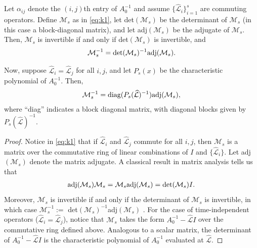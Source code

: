 \documentclass[review]{siamart}
\begin{document}
%
\begin{lemma}\label{lem:inv}
Let $\alpha_{ij}$ denote the $(i,j)$th entry of $A_0^{-1}$ and assume
$\{\widehat{\mathcal{L}}_i\}_{i=1}^s$ are commuting operators. Define $\mathcal{M}_s$
as in \eqref{eq:k1},
let det$(\mathcal{M}_s)$ be the determinant of $\mathcal{M}_s$ (in this case a block-diagonal
matrix), and let adj$(\mathcal{M}_s)$ be the adjugate of $\mathcal{M}_s$. Then, $\mathcal{M}_s$
is invertible if and only if det$(\mathcal{M}_s)$ is invertible, and
\begin{align*}
\mathcal{M}_s^{-1} = \textnormal{det}(\mathcal{M}_s)^{-1}\textnormal{adj}(\mathcal{M}_s).
\end{align*}
%

Now, suppose $\widehat{\mathcal{L}}_i = \widehat{\mathcal{L}}_j$ for
all $i,j$, and let $P_s(x)$ be the characteristic polynomial of $A_0^{-1}$. Then,
\begin{align*}
\mathcal{M}_s^{-1} = \textnormal{diag}(P_s(\widehat{\mathcal{L}})^{-1})\textnormal{adj}(\mathcal{M}_s),
\end{align*}
where ``diag'' indicates a block diagonal matrix, with diagonal blocks given by $P_s(\widehat{\mathcal{L}})^{-1}$.
\end{lemma}
%
\begin{proof}
Notice in \eqref{eq:k1} that if $\widehat{\mathcal{L}}_i$ and $\widehat{\mathcal{L}}_j$ commute for all $i,j$,
then $\mathcal{M}_s$ is a matrix over the commutative ring of linear combinations
of $I$ and $\{\widehat{\mathcal{L}}_i\}$. Let adj$(\mathcal{M}_s)$ denote the matrix adjugate. A
classical result in matrix analysis tells us that
%
\begin{align*}
\textnormal{adj}(\mathcal{M}_s)\mathcal{M}_s = \mathcal{M}_s\textnormal{adj}(\mathcal{M}_s)
	= \textnormal{det}(\mathcal{M}_s)I.
\end{align*}
%
Moreover, $\mathcal{M}_s$ is invertible if and only if the determinant of $\mathcal{M}_s$
is invertible, in which case $\mathcal{M}_s^{-1} := $ det$(\mathcal{M}_s)^{-1}$adj$(\mathcal{M}_s)$
\cite[Theorem 2.19 \& Corollary 2.21]{brown1993matrices}.
For the case of time-independent operators ($\widehat{\mathcal{L}}_i=\widehat{\mathcal{L}}_j$), notice that
$\mathcal{M}_s$ takes the form $A_0^{-1} - \widehat{\mathcal{L}}I$ over the commutative ring defined
above. Analogous to a scalar matrix, the determinant of $A_0^{-1} - \widehat{\mathcal{L}}I$ is the
characteristic polynomial of $A_0^{-1}$ evaluated at $\widehat{\mathcal{L}}$.
\end{proof}
%
\end{document}
